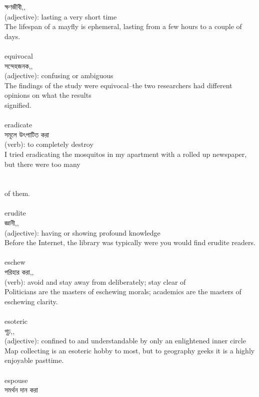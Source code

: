\documentclass{article}
\begin{document}
{ক্ষণজীবী,,}\\
{(adjective): lasting a very short time\\The lifespan of a mayfly is ephemeral, lasting from a few hours to a couple of days.\\}\\
{equivocal}\\
{সন্দেহজনক,,}\\
{(adjective): confusing or ambiguous\\The findings of the study were equivocal--the two researchers had different opinions on what the results\\signified.\\}\\
{eradicate}\\
{সমূলে উৎপাটিত করা}\\
{(verb): to completely destroy\\I tried eradicating the mosquitos in my apartment with a rolled up newspaper, but there were too many\\\\                                                                              \\of them.\\}\\
{erudite}\\
{জ্ঞানী,,}\\
{(adjective): having or showing profound knowledge\\Before the Internet, the library was typically were you would find erudite readers.\\}\\
{eschew}\\
{পরিহার করা,,}\\
{(verb): avoid and stay away from deliberately; stay clear of\\Politicians are the masters of eschewing morals; academics are the masters of eschewing clarity.\\}\\
{esoteric}\\
{গূঢ়,,}\\
{(adjective): confined to and understandable by only an enlightened inner circle\\Map collecting is an esoteric hobby to most, but to geography geeks it is a highly enjoyable pasttime.\\}\\
{espouse}\\
{সমর্থন দান করা}\\
\end{document}

